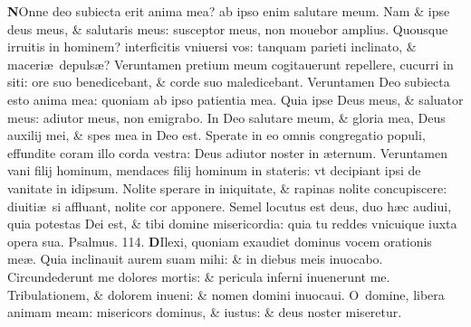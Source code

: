 \documentclass[a5paper,10pt]{book}
\def\ae{æ}
\begin{document}
\begin{multicols*}{2}
\lettrine[lines=2]{\bfseries \color{red} N}{}Onne deo subiecta erit anima mea? ab ipso enim salutare meum.
\newline \color{red} N\color{black}am \& ipse deus meus, \& salutaris meus: susceptor meus, non mouebor amplius.
\newline \color{red} Q\color{black}uousque irruitis in hominem? interficitis vniuersi vos: tanquam parieti inclinato, \& maceri\ae \ depuls\ae ?
\newline \color{red} V\color{black}eruntamen pretium meum cogitauerunt repellere, cucurri in siti: ore suo benedicebant, \& corde suo maledicebant.
\newline \color{red} V\color{black}eruntamen Deo subiecta esto anima mea: quoniam ab ipso patientia mea.
\newline \color{red} Q\color{black}uia ipse Deus meus, \& saluator meus: adiutor meus, non emigrabo.
\newline \color{red} I\color{black}n Deo salutare meum, \& gloria mea, Deus auxilij mei, \& spes mea in Deo est.
\newline \color{red} S\color{black}perate in eo omnis congregatio populi, effundite coram illo corda vestra: Deus adiutor noster in \ae ternum.
\newline \color{red} V\color{black}eruntamen vani filij hominum, mendaces filij hominum in stateris: vt decipiant ipsi de vanitate in idipsum.
\newline \color{red} N\color{black}olite sperare in iniquitate, \& rapinas nolite concupiscere: diuiti\ae \ si affluant, nolite cor apponere.
\newline \color{red} S\color{black}emel locutus est deus, duo h\ae c audiui, quia potestas Dei est, \& tibi domine misericordia: quia tu reddes vnicuique iuxta opera sua. \quad \color{red} Psalmus. \hypertarget{ps114}{114.} \color{black}
\vspace{-.5em}
\lettrine[lines=2]{\bfseries \color{red} D}{}Ilexi, quoniam exaudiet dominus vocem orationis me\ae .
\newline \color{red} Q\color{black}uia inclinauit aurem suam mihi: \& in diebus meis inuocabo.
\newline \color{red} C\color{black}ircundederunt me dolores mortis: \& pericula inferni inuenerunt me.
\newline \color{red} T\color{black}ribulationem, \& dolorem inueni: \& nomen domini inuocaui.
\newline \color{red} O\color{black}\ domine, libera animam meam: misericors dominus, \& iustus: \& deus noster miseretur.

\end{multicols*}
\end{document}

